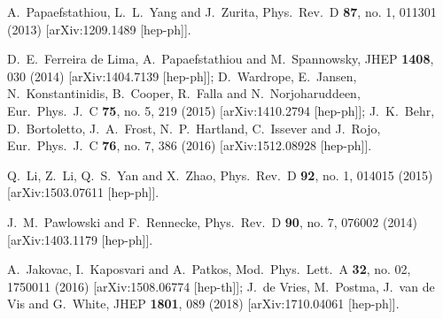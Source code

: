 \documentclass[aps,prd,11pt,tightenlines,superscriptaddress,nofootinbib,preprintnumbers,notitlepage]{revtex4-1}
\begin{document}
\begin{thebibliography}{99}
  A.~Papaefstathiou, L.~L.~Yang and J.~Zurita,
  Phys.\ Rev.\ D {\bf 87}, no. 1, 011301 (2013)
  [arXiv:1209.1489 [hep-ph]].

  D.~E.~Ferreira de Lima, A.~Papaefstathiou and M.~Spannowsky,
  JHEP {\bf 1408}, 030 (2014)
  [arXiv:1404.7139 [hep-ph]];
  D.~Wardrope, E.~Jansen, N.~Konstantinidis, B.~Cooper, R.~Falla and N.~Norjoharuddeen,
  Eur.\ Phys.\ J.\ C {\bf 75}, no. 5, 219 (2015)
  [arXiv:1410.2794 [hep-ph]];
  J.~K.~Behr, D.~Bortoletto, J.~A.~Frost, N.~P.~Hartland, C.~Issever and J.~Rojo,
  Eur.\ Phys.\ J.\ C {\bf 76}, no. 7, 386 (2016)
  [arXiv:1512.08928 [hep-ph]].

  Q.~Li, Z.~Li, Q.~S.~Yan and X.~Zhao,
  Phys.\ Rev.\ D {\bf 92}, no. 1, 014015 (2015)
  [arXiv:1503.07611 [hep-ph]].

  J.~M.~Pawlowski and F.~Rennecke,
  Phys.\ Rev.\ D {\bf 90}, no. 7, 076002 (2014)
  [arXiv:1403.1179 [hep-ph]].

    
  A.~Jakovac, I.~Kaposvari and A.~Patkos,
  Mod.\ Phys.\ Lett.\ A {\bf 32}, no. 02, 1750011 (2016)
  [arXiv:1508.06774 [hep-th]]; 
  J.~de Vries, M.~Postma, J.~van de Vis and G.~White,
  JHEP {\bf 1801}, 089 (2018)
  [arXiv:1710.04061 [hep-ph]].


\end{thebibliography}
\end{document}
